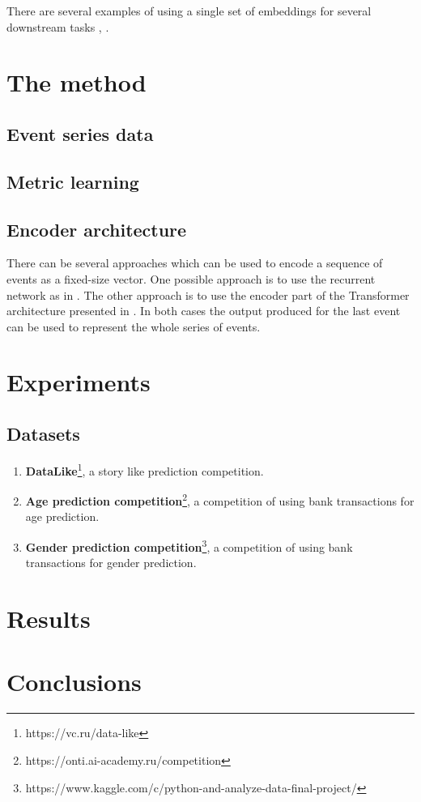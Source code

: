 \documentclass[sigconf]{acmart}
\begin{document}
There are several examples of using a single set of embeddings for several downstream tasks \cite{Song2017LearningUE}, \cite{Zhai:2019:LUE:3292500.3330739}.

\section{The method}

\subsection{Event series data}

\subsection{Metric learning}

\subsection{Encoder architecture}

There can be several approaches which can be used to encode a sequence of events as a fixed-size vector. One possible approach is to use the recurrent network as in \cite{Sutskever:2014:SSL:2969033.2969173}. The other approach is to use the encoder part of the Transformer architecture presented in \cite{DBLP:journals/corr/VaswaniSPUJGKP17}. In both cases the output produced for the last event can be used to represent the whole series of events.

\section{Experiments} \label{sec-exp}


\subsection{Datasets} \label{sec-datasets}
\begin{enumerate}
    \item \textbf{DataLike}\footnote{https://vc.ru/data-like}, a story like prediction competition.
    \item \textbf{Age prediction competition}\footnote{https://onti.ai-academy.ru/competition}, a competition of using bank transactions for age prediction.
    \item \textbf{Gender prediction competition}\footnote{https://www.kaggle.com/c/python-and-analyze-data-final-project/}, a competition of using bank transactions for gender prediction.
\end{enumerate}

\section{Results}

\section{Conclusions}



\end{document}

